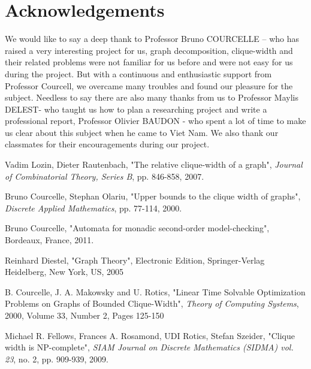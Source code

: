 \documentclass[a4paper, 12pt]{article}
\begin{document}
\section {Acknowledgements}
We would like to say a deep thank to Professor Bruno COURCELLE – who has raised a very interesting project for us, graph decomposition, clique-width and their related problems were not familiar for us before and were not easy for us during the project. But with a continuous and enthusiastic support from Professor Courcell, we overcame many troubles and found our pleasure for the subject.\newline\newline
Needless to say there are also many thanks from us  to Professor Maylis DELEST- who taught us how to plan a researching project and write a professional report, Professor Olivier BAUDON - who spent a lot of time to make us clear about this subject when he came to Viet Nam.\newline\newline
We also thank our classmates for their encouragements during our project.

\begin{thebibliography}{99}


  Vadim Lozin, Dieter Rautenbach, "The relative clique-width of a graph", \textit{Journal of Combinatorial Theory, Series B}, pp. 846-858, 2007.

 Bruno Courcelle, Stephan Olariu, "Upper bounds to the clique width of graphs", \textit{Discrete Applied Mathematics}, pp. 77-114, 2000.

 Bruno Courcelle, "Automata for monadic second-order model-checking", Bordeaux, France, 2011.

 Reinhard Diestel, "Graph Theory", Electronic Edition, Springer-Verlag Heidelberg, New York, US, 2005

 B. Courcelle, J. A. Makowsky and U. Rotics, "Linear Time Solvable Optimization Problems on Graphs of Bounded Clique-Width", \textit {Theory of Computing Systems}, 2000, Volume 33, Number 2, Pages 125-150

 Michael R. Fellows, Frances A. Rosamond, UDI Rotics, Stefan Szeider, "Clique width is NP-complete", \textit {SIAM Journal on Discrete Mathematics (SIDMA) vol. 23}, no. 2, pp. 909-939, 2009. 
\end{thebibliography}
\end{document}
